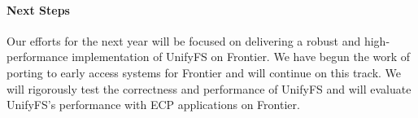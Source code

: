 %

\paragraph{Next Steps}

Our efforts for the next year will be focused on delivering a robust and 
high-performance implementation of UnifyFS on Frontier. We have begun the work
of porting to early access systems for Frontier and will continue on this track. 
We will rigorously test the correctness and performance of UnifyFS and will
evaluate UnifyFS's performance with ECP applications on Frontier.

